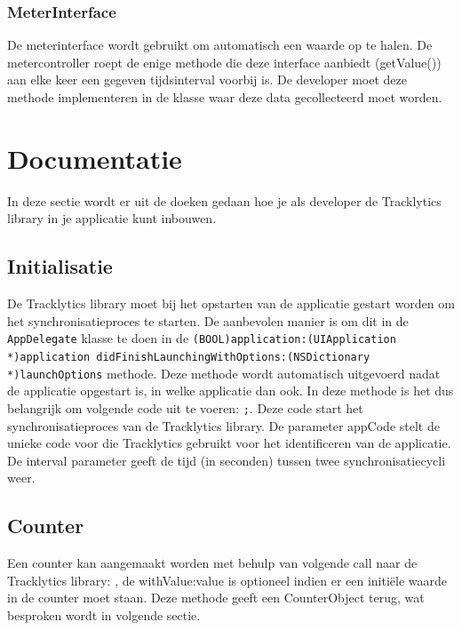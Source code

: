 \subsubsection{MeterInterface}\label{Klassediagram:MeterInferface}
De meterinterface wordt gebruikt om automatisch een waarde op te halen. De metercontroller roept de enige methode die deze interface aanbiedt (getValue()) aan elke keer een gegeven tijdsinterval voorbij is. De developer moet deze methode implementeren in de klasse waar deze data gecollecteerd moet worden.  


\section{Documentatie}
In deze sectie wordt er uit de doeken gedaan hoe je als developer de Tracklytics library in je applicatie kunt inbouwen. 


\subsection{Initialisatie}
De Tracklytics library moet bij het opstarten van de applicatie gestart worden om het synchronisatieproces te starten. De aanbevolen manier is om dit in de \texttt{\justify AppDelegate} klasse te doen in de \texttt{\justify (BOOL)application:(UIApplication *)application didFinishLaunchingWithOptions:(NSDictionary *)launchOptions} methode. Deze methode wordt automatisch uitgevoerd nadat de applicatie opgestart is, in welke applicatie dan ook. In deze methode is het dus belangrijk om volgende code uit te voeren: \texttt{;}. Deze code start het synchronisatieproces van de Tracklytics library. De parameter appCode stelt de unieke code voor die Tracklytics gebruikt voor het identificeren van de applicatie. De interval parameter geeft de tijd (in seconden) tussen twee synchronisatiecycli weer. 

\subsection{Counter}
Een counter kan aangemaakt worden met behulp van volgende call naar de Tracklytics library: \texttt{}, de withValue:value is optioneel indien er een initi\"ele waarde in de counter moet staan. Deze methode geeft een CounterObject terug, wat besproken wordt in volgende sectie. \\

